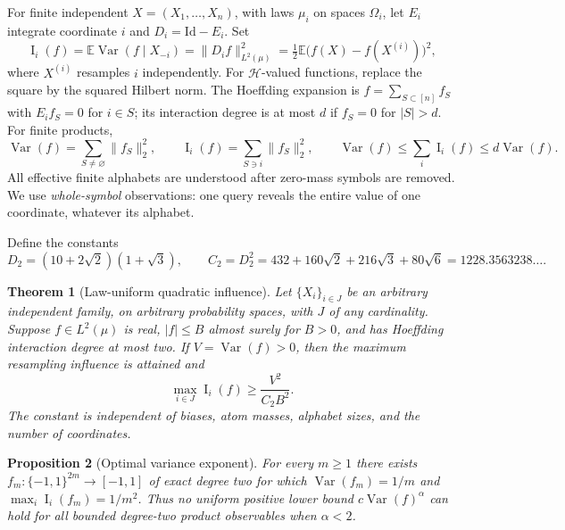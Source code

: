 \documentclass[11pt,letterpaper]{article}
\newtheorem{theorem}{Theorem}[section]
\newtheorem{proposition}[theorem]{Proposition}
\theoremstyle{definition}\newtheorem{definition}[theorem]{Definition}
\newcommand{\E}{\mathbb E}
\newcommand{\Var}{\operatorname{Var}}
\newcommand{\Inf}{\operatorname{I}}
\newcommand{\cH}{\mathcal H}
\newcommand{\Ctwo}{C_2}
\newcommand{\abs}[1]{\lvert #1\rvert}
\newcommand{\norm}[1]{\lVert #1\rVert}
\begin{document}
For finite independent $X=(X_1,\ldots,X_n)$, with laws $\mu_i$ on spaces $\Omega_i$, let $E_i$ integrate coordinate $i$ and $D_i=\mathrm{Id}-E_i$. Set
\begin{equation}\label{eq:infdef}
\Inf_i(f)=\E\Var(f\mid X_{-i})=\norm{D_i f}_{L^2(\mu)}^2
=\tfrac12\E\bigl(f(X)-f(X^{(i)})\bigr)^2,
\end{equation}
where $X^{(i)}$ resamples $i$ independently. For $\cH$-valued functions, replace the square by the squared Hilbert norm. The Hoeffding expansion is $f=\sum_{S\subset[n]}f_S$ with $E_i f_S=0$ for $i\in S$; its interaction degree is at most $d$ if $f_S=0$ for $\abs S>d$. For finite products,
\begin{equation}\label{eq:anova}
\Var(f)=\sum_{S\ne\varnothing}\norm{f_S}_2^2,\qquad
\Inf_i(f)=\sum_{S\ni i}\norm{f_S}_2^2,\qquad
\Var(f)\le\sum_i\Inf_i(f)\le d\Var(f).
\end{equation}
All effective finite alphabets are understood after zero-mass symbols are removed. We use \emph{whole-symbol} observations: one query reveals the entire value of one coordinate, whatever its alphabet.

Define the constants
\begin{equation}\label{eq:constants}
D_2=(10+2\sqrt2)(1+\sqrt3),\qquad
\Ctwo=D_2^2=432+160\sqrt2+216\sqrt3+80\sqrt6
=1228.3563238\ldots.
\end{equation}

\begin{theorem}[Law-uniform quadratic influence]\label{thm:q}
Let $\{X_i\}_{i\in J}$ be an arbitrary independent family, on arbitrary probability spaces, with $J$ of any cardinality. Suppose $f\in L^2(\mu)$ is real, $\abs f\le B$ almost surely for $B>0$, and has Hoeffding interaction degree at most two. If $V=\Var(f)>0$, then the maximum resampling influence is attained and
\begin{equation}\label{eq:Q}
\boxed{\displaystyle \max_{i\in J}\Inf_i(f)\ge\frac{V^2}{\Ctwo B^2}.}
\end{equation}
The constant is independent of biases, atom masses, alphabet sizes, and the number of coordinates.
\end{theorem}

\begin{proposition}[Optimal variance exponent]\label{prop:sharp}
For every $m\ge1$ there exists $f_m:\{-1,1\}^{2m}\to[-1,1]$ of \emph{exact} degree two for which $\Var(f_m)=1/m$ and $\max_i\Inf_i(f_m)=1/m^2$. Thus no uniform positive lower bound $c\Var(f)^\alpha$ can hold for all bounded degree-two product observables when $\alpha<2$.
\end{proposition}
\end{document}
